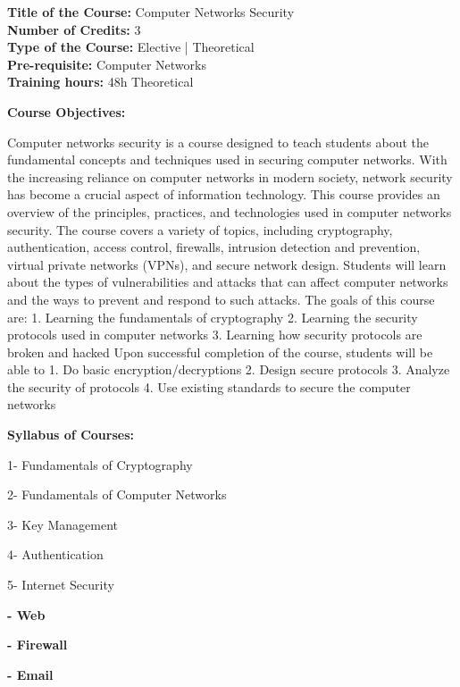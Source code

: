 \documentclass[12pt,a4paper]{article}
\begin{document}
\newpage
\textbf{Title of the Course:} Computer Networks Security\\
\textbf{Number of Credits:} 3\\
\textbf{Type of the Course:} Elective | Theoretical\\
\textbf{Pre-requisite:} Computer Networks\\
\textbf{Training hours:} 48h Theoretical\par\vspace{4pt}
\textbf{Course Objectives:}\par\vspace{2pt}
Computer networks security is a course designed to teach students about the fundamental concepts
and techniques used in securing computer networks. With the increasing reliance on computer
networks in modern society, network security has become a crucial aspect of information
technology. This course provides an overview of the principles, practices, and technologies used
in computer networks security. The course covers a variety of topics, including cryptography,
authentication, access control, firewalls, intrusion detection and prevention, virtual private
networks (VPNs), and secure network design. Students will learn about the types of vulnerabilities
and attacks that can affect computer networks and the ways to prevent and respond to such attacks.
The goals of this course are:
1. Learning the fundamentals of cryptography
2. Learning the security protocols used in computer networks
3. Learning how security protocols are broken and hacked
Upon successful completion of the course, students will be able to
1. Do basic encryption/decryptions
2. Design secure protocols
3. Analyze the security of protocols
4. Use existing standards to secure the computer networks\par\vspace{4pt}
\textbf{Syllabus of Courses:}\par\vspace{2pt}
1- Fundamentals of Cryptography\par
2- Fundamentals of Computer Networks\par
3- Key Management\par
4- Authentication\par
5- Internet Security\par
\vspace{2pt}\textbf{- Web}\par
\vspace{2pt}\textbf{- Firewall}\par
\vspace{2pt}\textbf{- Email}\par
\end{document}
